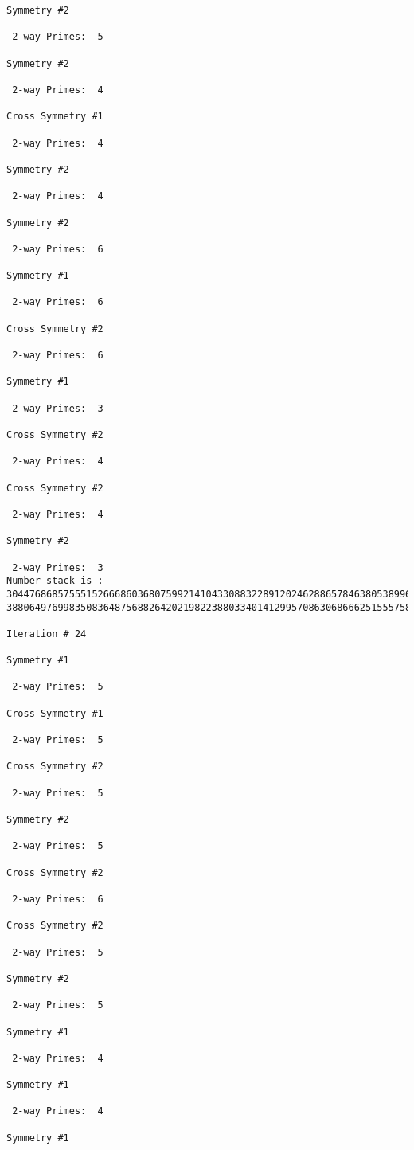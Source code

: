 \begin{verbatim}
Symmetry #2

 2-way Primes: 	5

Symmetry #2

 2-way Primes: 	4

Cross Symmetry #1

 2-way Primes: 	4

Symmetry #2

 2-way Primes: 	4

Symmetry #2

 2-way Primes: 	6

Symmetry #1

 2-way Primes: 	6

Cross Symmetry #2

 2-way Primes: 	6

Symmetry #1

 2-way Primes: 	3

Cross Symmetry #2

 2-way Primes: 	4

Cross Symmetry #2

 2-way Primes: 	4

Symmetry #2

 2-way Primes: 	3
Number stack is :
30447686857555152666860368075992141043308832289120246288657846380538996794608835958544046240163340857
38806497699835083648756882642021982238803340141299570863068666251555758686744037580433610426404458595

Iteration #	24

Symmetry #1

 2-way Primes: 	5

Cross Symmetry #1

 2-way Primes: 	5

Cross Symmetry #2

 2-way Primes: 	5

Symmetry #2

 2-way Primes: 	5

Cross Symmetry #2

 2-way Primes: 	6

Cross Symmetry #2

 2-way Primes: 	5

Symmetry #2

 2-way Primes: 	5

Symmetry #1

 2-way Primes: 	4

Symmetry #1

 2-way Primes: 	4

Symmetry #1


\end{verbatim}
